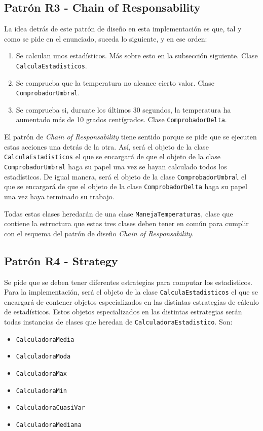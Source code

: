 \subsection{Patrón R3 - Chain of Responsability}

La idea detrás de este patrón de diseño en esta implementación es que, tal y como se pide en el enunciado, suceda lo siguiente, y en ese orden:

\begin{enumerate}
    \item Se calculan unos estadísticos. Más sobre esto en la subsección siguiente. Clase \texttt{CalculaEstadisticos}.

    \item Se comprueba que la temperatura no alcance cierto valor. Clase \texttt{ComprobadorUmbral}.

    \item Se comprueba si, durante los últimos 30 segundos, la temperatura ha aumentado más de 10 grados centígrados. Clase \texttt{ComprobadorDelta}.
\end{enumerate}

El patrón de \textit{Chain of Responsability} tiene sentido porque se pide que se ejecuten estas acciones una detrás de la otra. Así, será el objeto de la clase \texttt{CalculaEstadisticos} el que se encargará de que el objeto de la clase \texttt{ComprobadorUmbral} haga su papel una vez se hayan calculado todos los estadísticos. De igual manera, será el objeto de la clase \texttt{ComprobadorUmbral} el que se encargará de que el objeto de la clase \texttt{ComprobadorDelta} haga su papel una vez haya terminado su trabajo.

Todas estas clases heredarán de una clase \texttt{ManejaTemperaturas}, clase que contiene la estructura que estas tres clases deben tener en común para cumplir con el esquema del patrón de diseño \textit{Chain of Responsability}.

\subsection{Patrón R4 - Strategy}

Se pide que se deben tener diferentes estrategias para computar los estadísticos. Para la implementación, será el objeto de la clase \texttt{CalculaEstadisticos} el que se encargará de contener objetos especializados en las distintas estrategias de cálculo de estadísticos. Estos objetos especializados en las distintas estrategias serán todas instancias de clases que heredan de \texttt{CalculadoraEstadistico}. Son:

\begin{itemize}
    \item \texttt{CalculadoraMedia}
    \item \texttt{CalculadoraModa}
    \item \texttt{CalculadoraMax}
    \item \texttt{CalculadoraMin}
    \item \texttt{CalculadoraCuasiVar}
    \item \texttt{CalculadoraMediana}
\end{itemize}
